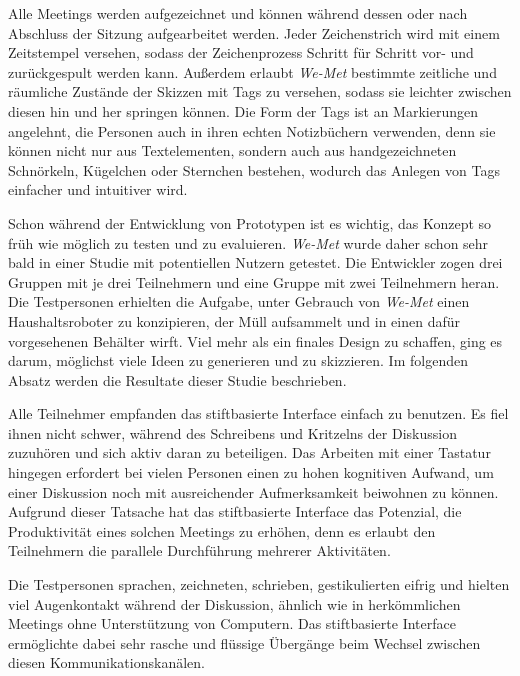 Alle Meetings werden aufgezeichnet und können während dessen oder nach Abschluss der Sitzung aufgearbeitet werden. Jeder Zeichenstrich wird mit einem Zeitstempel versehen, sodass der Zeichenprozess Schritt für Schritt vor- und zurückgespult werden kann. Außerdem erlaubt \emph{We-Met} bestimmte zeitliche und räumliche Zustände der Skizzen mit Tags zu versehen, sodass sie leichter zwischen diesen hin und her springen können. Die Form der Tags ist an Markierungen angelehnt, die Personen auch in ihren echten Notizbüchern verwenden, denn sie können nicht nur aus Textelementen, sondern auch aus handgezeichneten Schnörkeln, Kügelchen oder Sternchen bestehen, wodurch das Anlegen von Tags einfacher und intuitiver wird.

\medskip Schon während der Entwicklung von Prototypen ist es wichtig, das Konzept so früh wie möglich zu testen und zu evaluieren. \emph{We-Met} wurde daher schon sehr bald in einer Studie mit potentiellen Nutzern getestet. Die Entwickler zogen drei Gruppen mit je drei Teilnehmern und eine Gruppe mit zwei Teilnehmern heran. Die Testpersonen erhielten die Aufgabe, unter Gebrauch von \emph{We-Met} einen Haushaltsroboter zu konzipieren, der Müll aufsammelt und in einen dafür vorgesehenen Behälter wirft. Viel mehr als ein finales Design zu schaffen, ging es darum, möglichst viele Ideen zu generieren und zu skizzieren. Im folgenden Absatz werden die Resultate dieser Studie beschrieben.

\medskip Alle Teilnehmer empfanden das stiftbasierte Interface einfach zu benutzen. Es fiel ihnen nicht schwer, während des Schreibens und Kritzelns der Diskussion zuzuhören und sich aktiv daran zu beteiligen. Das Arbeiten mit einer Tastatur hingegen erfordert bei vielen Personen einen zu hohen kognitiven Aufwand, um einer Diskussion noch mit ausreichender Aufmerksamkeit beiwohnen zu können. Aufgrund dieser Tatsache hat das stiftbasierte Interface das Potenzial, die Produktivität eines solchen Meetings zu erhöhen, denn es erlaubt den Teilnehmern die parallele Durchführung mehrerer Aktivitäten.
	
\medskip Die Testpersonen sprachen, zeichneten, schrieben, gestikulierten eifrig und hielten viel Augenkontakt während der Diskussion, ähnlich wie in herkömmlichen Meetings ohne Unterstützung von Computern. Das stiftbasierte Interface ermöglichte dabei sehr rasche und flüssige Übergänge beim Wechsel zwischen diesen Kommunikationskanälen.
	

